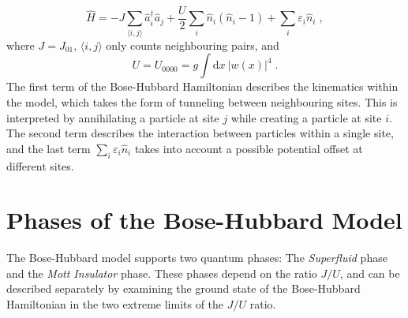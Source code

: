 \begin{equation}
	\hat{H} = - J \sum_{\langle i,j \rangle} \hat{a}_{i}^{\dag} \hat{a}_{j} + \frac{U}{2} \sum_{i} \hat{n}_i \left( \hat{n}_i -1 \right) + \sum_{i} \varepsilon_i \hat{n}_i \; ,
	\label{BHhamil}
\end{equation}
where $J = J_{0 1}$, $\langle i,j \rangle$ only counts neighbouring pairs, and
\begin{equation}
	U = U_{0 0 0 0} = g \int \mathrm{d}x \ |w(x)|^4 \; .
	\label{eq:BHparamU}
\end{equation}
The first term of the Bose-Hubbard Hamiltonian describes the kinematics within the model, which takes the form of tunneling between neighbouring sites. This is interpreted by annihilating a particle at site $j$ while creating a particle at site $i$. The second term describes the interaction between particles within a single site, and the last term $\sum_{i} \varepsilon_i \hat{n}_i$ takes into account a possible potential offset at different sites.


\section{Phases of the Bose-Hubbard Model}

The Bose-Hubbard model supports two quantum phases: The \textit{Superfluid} phase and the \textit{Mott Insulator} phase. These phases depend on the ratio $J/U$, and can be described separately by examining the ground state of the Bose-Hubbard Hamiltonian in the two extreme limits of the $J/U$ ratio.

